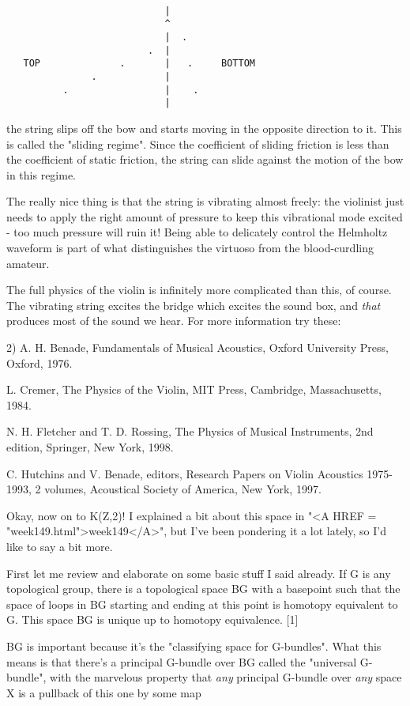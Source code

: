 \begin{verbatim}

                            |
                            ^
                            |  .
                         .  | 
   TOP              .       |   .     BOTTOM
               .            | 
          .                 |    .
                            |
\end{verbatim}
    
the string slips off the bow and starts moving in the opposite direction
to it.   This is called the "sliding regime".  Since the coefficient of
sliding friction is less than the coefficient of static friction, the
string can slide against the motion of the bow in this regime.

The really nice thing is that the string is vibrating almost freely: the
violinist just needs to apply the right amount of pressure to keep this
vibrational mode excited - too much pressure will ruin it!  Being able
to delicately control the Helmholtz waveform is part of what distinguishes 
the virtuoso from the blood-curdling amateur.

The full physics of the violin is infinitely more complicated than this,
of course.  The vibrating string excites the bridge which excites the
sound box, and \emph{that} produces most of the sound we hear.  For more
information try these:

2) A. H. Benade, Fundamentals of Musical Acoustics, Oxford University
Press, Oxford, 1976.

L. Cremer, The Physics of the Violin, MIT Press, Cambridge, Massachusetts,
1984.

N. H. Fletcher and T. D. Rossing, The Physics of Musical Instruments, 
2nd edition, Springer, New York, 1998.

C. Hutchins and V. Benade, editors, Research Papers on Violin Acoustics
1975-1993, 2 volumes, Acoustical Society of America, New York, 1997.

Okay, now on to K(Z,2)!  I explained a bit about this space in "<A HREF = "week149.html">week149</A>",
but I've been pondering it a lot lately, so I'd like to say a bit more.  

First let me review and elaborate on some basic stuff I said already.   
If G is any topological group, there is a topological 
space BG with a basepoint such that the space of loops in BG starting 
and ending at this point is homotopy equivalent to G.  This space BG 
is unique up to homotopy equivalence.  [1]

BG is important because it's the "classifying space for G-bundles".  
What this means is that there's a principal G-bundle over BG called
the "universal G-bundle", with the marvelous property that \emph{any}
principal G-bundle over \emph{any} space X is a pullback of this one by 
some map

